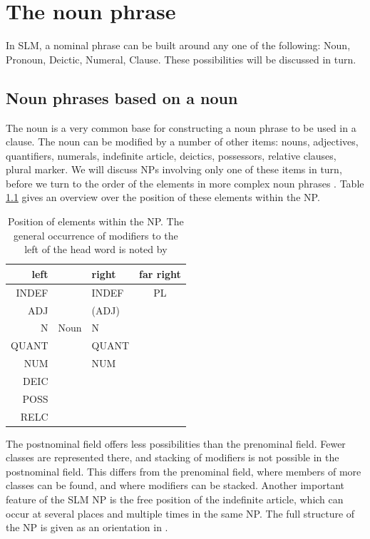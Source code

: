 \chapter{The noun phrase}\label{sec:form:ConstructionsNP}
In SLM, a nominal phrase  can be built around any one of the following: Noun, Pronoun, Deictic,  Numeral, Clause. These possibilities will be discussed in turn.

\section{Noun phrases based on a noun}\label{sec:nppp:Nounphrasesbasedonanoun}
The noun is a very common base for constructing a noun phrase to be used in a clause. The noun can be modified by a number of other items: nouns, adjectives, quantifiers, numerals, indefinite article, deictics,  possessors, relative clauses, plural marker. We will discuss NPs involving only one of these items in turn, before we turn to the order of the elements in more complex noun phrases . Table \ref{tab:PositionOfSeveralElementsWithinTheNP} gives an overview over the position of these elements within the NP.

\begin{table}[t]
	\centering
		\begin{tabular}{rclc}
			left 	&   	& right & far right\\
			\hline
			INDEF 	&     	& \textsc{INDEF} & PL	\\
			ADJ   	&       & (ADJ)	&	\\
			N   	& Noun 	& N 	&	\\
			QUANT  	& 	& QUANT &	\\
			NUM  	& 	& NUM 	&	\\
			DEIC  	& 	& 	&	\\
			POSS  	& 	& 	&	\\
			RELC  	& 	& 	&	\\
		\end{tabular}
	\caption[Position of elements within the NP]{Position of elements within the NP. The general occurrence of modifiers to the left of the head word is noted by \citet{Adelaar1991, Adelaar2005struct, SmithEtAl2004}}
	\label{tab:PositionOfSeveralElementsWithinTheNP}
\end{table}

The postnominal field offers less possibilities than the prenominal field. Fewer classes are represented there, and stacking of modifiers is not possible in the postnominal field. This differs from the prenominal field, where members of more classes can be found, and where modifiers can be stacked. Another important feature of the SLM NP is the free position of the indefinite article, which can occur at several places and multiple times in the same NP. The full structure of the NP is given as an orientation in .

